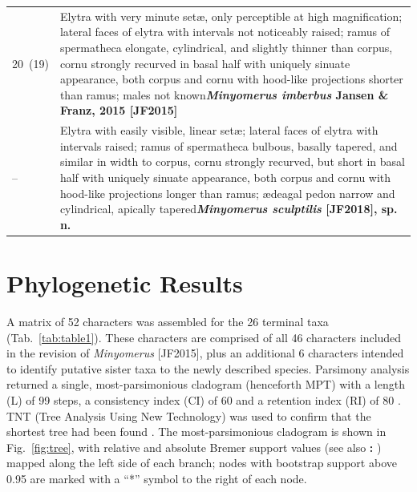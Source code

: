 \documentclass[fleqn,10pt,lineno]{wlpeerj} %
\newcommand{\breakfill}{\dotfill\newline\penalty0\hbox{}\nobreak\dotfill}
\begin{document}
\begin{xtabular}{@{}
                p{\dimexpr.1\textwidth-\tabcolsep\relax}
                p{\dimexpr.9\textwidth-\tabcolsep\relax}@{}}
		{20~(19)} & {Elytra with very minute set{\ae}, only perceptible at high magnification; lateral faces of elytra with intervals not noticeably raised; ramus of spermatheca elongate, cylindrical, and slightly thinner than corpus, cornu strongly recurved in basal half with uniquely sinuate appearance, both corpus and cornu with hood-like projections shorter than ramus; males not known}{\breakfill}{\textbf{\textit{Minyomerus imberbus} Jansen \& Franz, 2015 [JF2015]}}\\
		{--} & {Elytra with easily visible, linear set{\ae}; lateral faces of elytra with intervals raised; ramus of spermatheca bulbous, basally tapered, and similar in width to corpus, cornu strongly recurved, but short in basal half with uniquely sinuate appearance, both corpus and cornu with hood-like projections longer than ramus; {\ae}deagal pedon narrow and cylindrical, apically tapered}{\breakfill}{\textbf{\textit{Minyomerus sculptilis} [JF2018], sp. n.}}\\
	\end{xtabular}
	
\section*{Phylogenetic Results}\label{sec:results}
	A matrix of 52 characters was assembled for the 26 terminal taxa (Tab.~\ref{tab:table1}).
	These characters are comprised of all 46 characters included in the revision of \textit{Minyomerus} [JF2015], plus an additional 6 characters intended to identify putative sister taxa to the newly described species.
	Parsimony analysis returned a single, most-parsimonious cladogram (henceforth MPT) with a length (L) of 99 steps, a consistency index (CI) of 60 and a retention index (RI) of 80 \citep{farris1989}.
	TNT (Tree Analysis Using New Technology) was used to confirm that the shortest tree had been found \citep{goloboff2008}.
	The most-parsimonious cladogram is shown in Fig.~\ref{fig:tree}, with relative and absolute Bremer support values (see also \textbf{: }) mapped along the left side of each branch; nodes with bootstrap support above 0.95 are marked with a ``*'' symbol to the right of each node.
	
\end{document}
